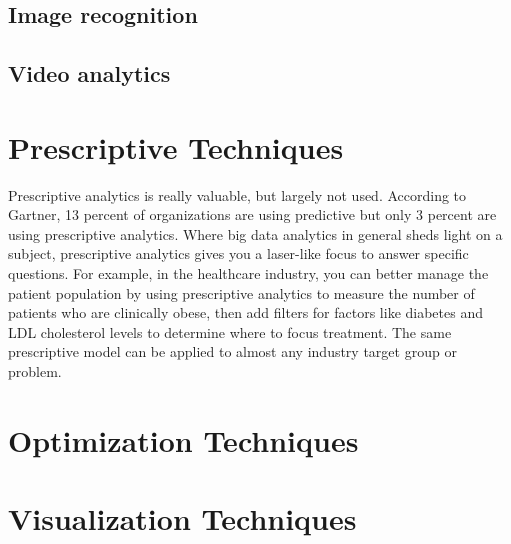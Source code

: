 \section{Image recognition}

\section{Video analytics}

\setlength{\footskip}{8mm}

\chapter{Prescriptive Techniques} 
\label{prescriptive-techniques}

Prescriptive analytics is really valuable, but largely not used. According to Gartner, 13 percent of organizations are using predictive but only 3 percent are using prescriptive analytics. Where big data analytics in general sheds light on a subject, prescriptive analytics gives you a laser-like focus to answer specific questions. For example, in the healthcare industry, you can better manage the patient population by using prescriptive analytics to measure the number of patients who are clinically obese, then add filters for factors like diabetes and LDL cholesterol levels to determine where to focus treatment. The same prescriptive model can be applied to almost any industry target group or problem.




%
%
%
%

\setlength{\footskip}{8mm}

\chapter{Optimization Techniques} 
\label{optimization-techniques}





%
%
%
%

\setlength{\footskip}{8mm}

\chapter{Visualization Techniques} 
\label{visualization-techniques}





%
%
%
%

\setlength{\footskip}{8mm}

